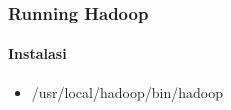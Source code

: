 \documentclass{beamer}
\begin{document}
\begin{frame}[t]
\frametitle{Running Hadoop}
\framesubtitle{Instalasi}
\begin{itemize}
\item /usr/local/hadoop/bin/hadoop
\end{itemize}
\end{frame}

\end{document}
